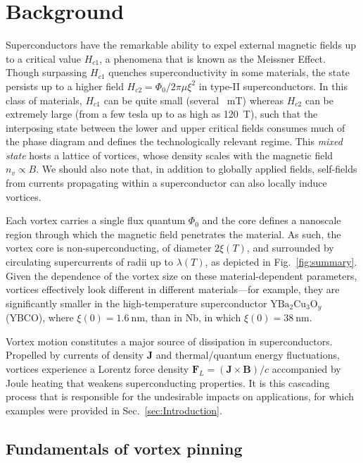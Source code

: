 \documentclass[%
 aip,
 amsmath,amssymb,
 reprint,%
floatfix]{revtex4-1}
\renewcommand{\vec}[1]{\boldsymbol{#1}}
\newcommand{\Hctwo}{H_{c2}}
\newcommand{\Hcone}{H_{c1}}
\begin{document}
\section{Background}
Superconductors have the remarkable ability to expel external magnetic fields up to a critical value $\Hcone$, a phenomena that is known as the Meissner Effect.  Though surpassing $\Hcone$ quenches superconductivity in some materials, the state persists up to a higher field $\Hctwo=\Phi_0/2\pi\mu\xi^2$ in type-II superconductors.  In this class of materials, $\Hcone$ can be quite small (several \SI{}{\milli\tesla}) whereas $\Hctwo$ can be extremely large (from a few tesla up to as high as \SI{120}{\tesla})\cite{NMiura2002}, such that the interposing state between the lower and upper critical fields consumes much of the phase diagram and defines the technologically relevant regime.  This \textit{mixed state} hosts a lattice of vortices, whose density scales with the magnetic field $n_v \propto B$.  We should also note that, in addition to globally applied fields, self-fields from currents propagating within a superconductor can also locally induce vortices.


Each vortex carries a single flux quantum $\Phi_0$ and the core defines a nanoscale region through which the magnetic field penetrates the material. As such, the vortex core is non-superconducting, of diameter $2\xi(T)$, and surrounded by circulating supercurrents of radii up to $\lambda(T)$, as depicted in Fig.~\ref{fig:summary}. Given the dependence of the vortex size on these material-dependent parameters, vortices effectively look different in different materials---for example, they are significantly smaller in the high-temperature superconductor $\mathrm{Y}\mathrm{Ba}_2\mathrm{Cu}_3\mathrm{O}_y$ (YBCO), where $\xi(0) = \SI{1.6}{\nano\meter}$, than in Nb, in which $\xi(0)= \SI{38}{\nano\meter}$.\cite{Wimbush2015}


Vortex motion constitutes a major source of dissipation in superconductors. Propelled by currents of density $\vec{J}$ and thermal/quantum energy fluctuations, vortices experience a Lorentz force density $\vec{F}_{L} = (\vec{J} \times \vec{B})/c$ accompanied by Joule heating that weakens superconducting properties. It is this cascading process that is responsible for the undesirable impacts on applications, for which examples were provided in Sec.~\ref{sec:Introduction}.



\subsection{\label{sec:vortexpinning}Fundamentals of vortex pinning} 
\end{document}
